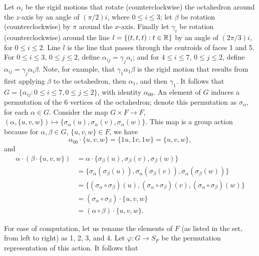 \begin{enumerate}
      Let $\alpha_i$ be the rigid motions that rotate (counterclockwise) the 
      octahedron around the $z$-axis by an angle of $(\pi/2)i$, where
      $0 \le i \le 3$; let $\beta$ be rotation (counterclockwise) by $\pi$
      around the $x$-axis. Finally let $\gamma_i$ be rotation (counterclockwise) 
      around the line $l = \{(t, t, t) : t \in \mathbb{R}\}$ by an angle of $(2\pi/3)i$, 
      for $0 \le i \le 2$. Line $l$ is the line that passes through the
      centroids of faces 1 and 5. For $0 \le i \le 3$, $0 \le j \le 2$, define
      $\alpha_{ij} = \gamma_j\alpha_i$; and for $4 \le i \le 7$,
      $0 \le j \le 2$, define $\alpha_{ij} = \gamma_j\alpha_i\beta$. Note, for 
      example, that $\gamma_1\alpha_1\beta$ is the rigid motion that results
      from first applying $\beta$ to the octahedron, then $\alpha_1$, and then
      $\gamma_1$. It follows that
      $G = \{\alpha_{ij} : 0 \le i \le 7, 0 \le j \le 2\}$, with identity
      $\alpha_{00}$. An element of $G$ induces a permutation of the 6 vertices
      of the octahedron; denote this permutation as $\sigma_\alpha$, for each
      $\alpha \in G$. Consider the map $G \times F \rightarrow F$,
      $(\alpha, \{u, v, w\}) \mapsto \{\sigma_\alpha(u), \sigma_\alpha(v),
      \sigma_\alpha(w)\}$. This
      map is a group action because for $\alpha, \beta \in G$,
      $\{u, v, w\} \in F$, we have
      $$\alpha_{00} \cdot \{u, v, w\} = \{1u, 1v, 1w\} = \{u, v, w\},$$
      and
      \begin{align*}
         \alpha \cdot (\beta \cdot \{u, v, w\}) &=
         \alpha \cdot \{\sigma_\beta(u), \sigma_\beta(v), \sigma_\beta(w)\} \\
         &= \{\sigma_\alpha(\sigma_\beta(u)), \sigma_\alpha(\sigma_\beta(v)),
              \sigma_\alpha(\sigma_\beta(w))\} \\
         &= \{(\sigma_\alpha\circ\sigma_\beta)(u),
              (\sigma_\alpha\circ\sigma_\beta)(v),
              (\sigma_\alpha\circ\sigma_\beta)(w)\} \\
                     &= (\sigma_\alpha\circ\sigma_\beta) \cdot \{u, v, w\} \\
                     &= (\alpha\circ\beta) \cdot \{u, v, w\}.
      \end{align*}

      For ease of computation, let us rename the elements of $F$ (as listed in
      the set, from left to right) as 1, 2, 3, and 4. Let
      $\varphi : G \rightarrow S_F$ be the permutation representation of this
      action. It follows that      


\end{enumerate}
